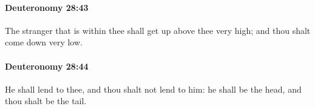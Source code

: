 		\paragraph{Deuteronomy 28:43} %
			\label{DEUTERONOMY-28-43}

			The stranger that is within thee shall get up above thee very high; and thou shalt come down very low.


		\paragraph{Deuteronomy 28:44} %
			\label{DEUTERONOMY-28-44}

			He shall lend to thee, and thou shalt not lend to him: he shall be the head, and thou shalt be the tail.


